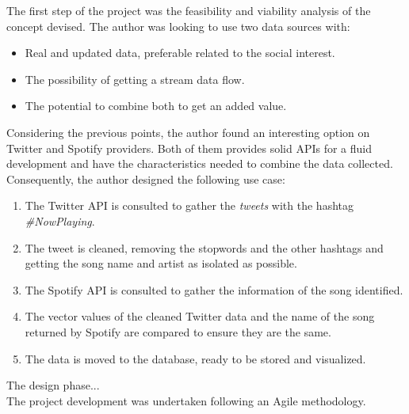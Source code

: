 

\nonzeroparskip The first step of the project was the feasibility and viability analysis of the concept devised. The author was looking to use two data sources with:

\begin{itemize}
	\item Real and updated data, preferable related to the social interest.
	\item The possibility of getting a stream data flow.
	\item The potential to combine both to get an added value.
\end{itemize}

Considering the previous points, the author found an interesting option on Twitter and Spotify providers. Both of them provides solid APIs for a fluid development and have the characteristics needed to combine the data collected. Consequently, the author designed the following use case:

\begin{enumerate}
	\item The Twitter API is consulted to gather the \textit{tweets} with the hashtag \textit{\#NowPlaying}.
	\item The tweet is cleaned, removing the stopwords and the other hashtags and getting the song name and artist as isolated as possible.
	\item The Spotify API is consulted to gather the information of the song identified.
	\item The vector values of the cleaned Twitter data and the name of the song returned by Spotify are compared to ensure they are the same.
	\item The data is moved to the database, ready to be stored and visualized.
\end{enumerate}

The design phase...\\

The project development was undertaken following an Agile methodology.\\